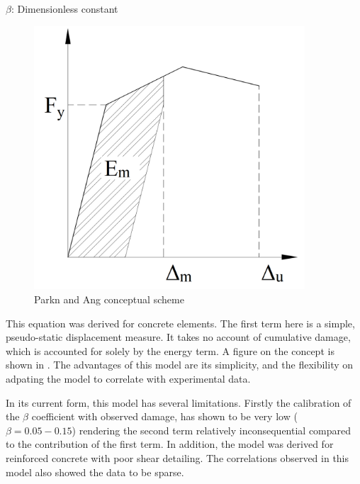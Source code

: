 $\beta$: Dimensionless constant 

\begin{figure}[htbp]
\centering
\includegraphics[width=0.9\textwidth]{Chapter-2/figs/Park_and_Ang_Model}
\caption{Parkn and Ang conceptual scheme}
\label{fig:Paa}
\end{figure}

This equation was derived for concrete elements. The first term here is a simple, pseudo-static displacement measure. It takes no account of cumulative damage, which is accounted for solely by the energy term. A figure on the concept is shown in . The advantages of this model are its simplicity, and the flexibility on adpating the model to correlate with experimental data.  

In its current form, this model has several limitations. Firstly the calibration of the $\beta$ coefficient with observed damage, has shown to be very low ($\beta=0.05-0.15$) rendering the second term relatively inconsequential compared to the contribution of the first term. In addition, the model was derived for reinforced concrete with poor shear detailing. The correlations observed in this model also showed the data to be sparse. 

